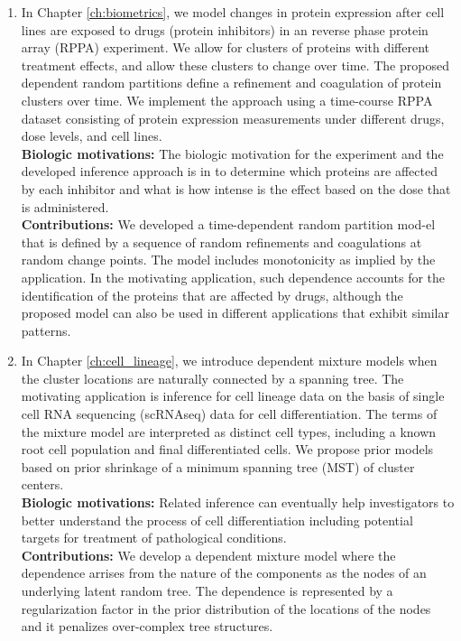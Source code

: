 \begin{enumerate}
\item In Chapter \ref{ch:biometrics}, we model changes in protein expression after cell lines are exposed to drugs (protein inhibitors) in an reverse phase protein array  (RPPA) experiment. We allow for clusters of proteins with different treatment effects, and allow these clusters to change over time. The proposed dependent random partitions define a refinement and coagulation of protein clusters over time. We implement the approach using a time-course RPPA dataset consisting of protein expression measurements under different drugs, dose levels, and cell lines.\\
\textbf{Biologic motivations:} The biologic motivation for the experiment and the developed inference approach is in to determine which proteins are affected by each inhibitor and what is how intense is the effect based on the dose that is administered.\\
\textbf{Contributions:} We developed a time-dependent random partition mod-el that is defined by a sequence of random refinements and coagulations at random change points. The model includes monotonicity as implied by the application. In the motivating application, such dependence accounts for the identification of the proteins that are affected by drugs, although the proposed model can also be used in different applications that exhibit similar patterns.

\item In Chapter \ref{ch:cell_lineage}, we introduce dependent mixture models when the cluster locations are naturally connected by a spanning tree. The motivating application is inference for cell lineage data on the basis of single cell RNA sequencing (scRNAseq) data for cell differentiation. The terms of the mixture model are interpreted as distinct cell types, including a known root cell population and final differentiated cells. We propose prior models based on prior shrinkage of a minimum spanning tree (MST) of cluster centers. \\
\textbf{Biologic motivations:} Related inference can eventually help investigators to better understand the process of cell differentiation including potential targets for treatment of pathological conditions.\\
\textbf{Contributions: } We develop a dependent mixture model where the dependence arrises from the nature of the components as the nodes of an underlying latent random tree. The dependence is represented by a regularization factor in the prior distribution of the locations of the nodes and it penalizes over-complex tree structures. 


\end{enumerate}
